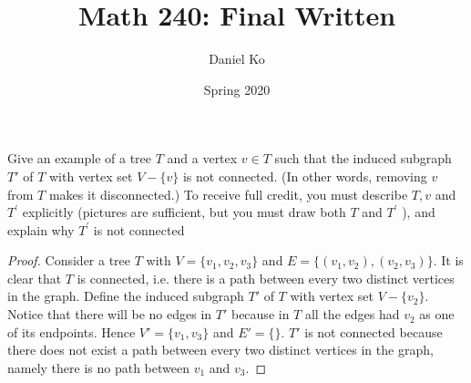 \documentclass[11pt]{scrartcl}
\title{Math 240: Final Written}
\author{Daniel Ko}
\date{Spring 2020}
\begin{document}
\maketitle

\section{}
Give an example of a tree $T$ and a vertex $v \in T$ such that the induced subgraph $T'$ of $T$ with vertex set
$V-\{v\}$ is not connected. (In other words, removing $v$ from $T$ makes it disconnected.)
To receive full credit, you must describe $T, v$ and $T^{\prime}$ explicitly (pictures are sufficient, but you must draw both $T$ and $T^{\prime}$ ), and explain why $T^{\prime}$ is not connected
\begin{proof}
	Consider a tree $T$ with $V = \{v_1,v_2,v_3\}$ and $E = \{(v_1,v_2),(v_2,v_3)\}$. It is clear that $T$ is connected,
	i.e. there is a path between every two distinct vertices in the graph. Define the induced subgraph $T'$ of $T$
	with vertex set $V-\{v_2\}$. Notice that there will be no edges in $T'$ because in $T$ all the edges had $v_2$ as
	one of its endpoints. Hence $V' =\{v_1,v_3\}$ and $E' = \{\}$. $T'$ is not connected because there does not
	exist a path between every two distinct vertices in the graph, namely there is no path between $v_1$ and $v_3$.
\end{proof}
\end{document}
